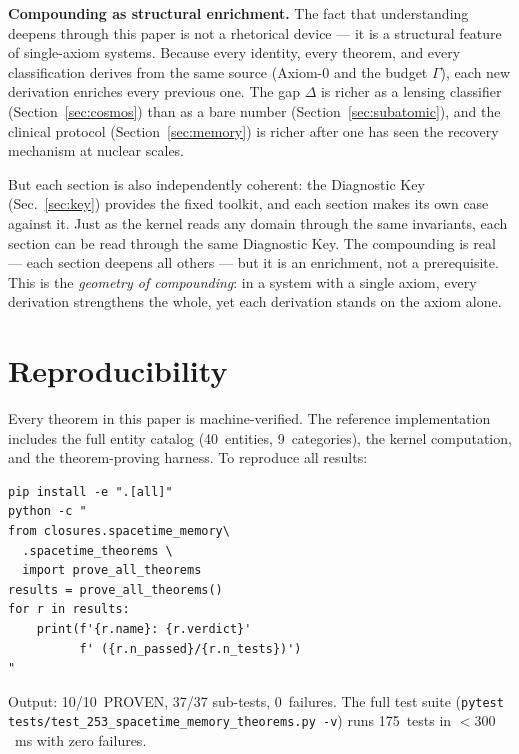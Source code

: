 \documentclass[
  aps,
  prd,
  twocolumn,
  superscriptaddress,
  nofootinbib,
  floatfix
]{revtex4-2}
\newcommand{\Gam}{\Gamma}
\begin{document}
\textbf{Compounding as structural enrichment.}
The fact that understanding deepens through this paper is
not a rhetorical device --- it is a structural feature of
single-axiom systems.  Because every identity, every theorem,
and every classification derives from the same source
(Axiom-0 and the budget $\Gam$), each new derivation enriches
every previous one.  The gap $\Delta$ is richer as a lensing
classifier (Section~\ref{sec:cosmos}) than as a bare number
(Section~\ref{sec:subatomic}), and the clinical protocol
(Section~\ref{sec:memory}) is richer after one has seen the
recovery mechanism at nuclear scales.

But each section is also independently coherent: the
Diagnostic Key (Sec.~\ref{sec:key}) provides the fixed
toolkit, and each section makes its own case against it.
Just as the kernel reads any domain through the same
invariants, each section can be read through the same
Diagnostic Key.  The compounding is real --- each section
deepens all others --- but it is an enrichment, not a
prerequisite.  This is the \emph{geometry of
compounding}: in a system with a single axiom, every
derivation strengthens the whole, yet each derivation
stands on the axiom alone.


\section{Reproducibility}\label{sec:howto}

Every theorem in this paper is machine-verified.  The
reference implementation~\cite{umcpmetadatarepo} includes
the full entity catalog (40~entities, 9~categories), the
kernel computation, and the theorem-proving harness.  To
reproduce all results:

\begin{small}
\begin{verbatim}
pip install -e ".[all]"
python -c "
from closures.spacetime_memory\
  .spacetime_theorems \
  import prove_all_theorems
results = prove_all_theorems()
for r in results:
    print(f'{r.name}: {r.verdict}'
          f' ({r.n_passed}/{r.n_tests})')
"
\end{verbatim}
\end{small}

Output: 10/10~PROVEN, 37/37 sub-tests, 0~failures.  The
full test suite (\texttt{pytest
tests/test\_253\_spacetime\_memory\_theorems.py -v})
runs 175~tests in $< 300$~ms with zero failures.
\end{document}
